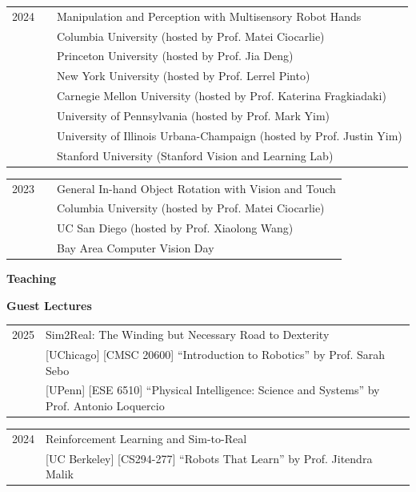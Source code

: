 \documentclass{resume}
\newlength{\myvertspace}
\newcommand{\vs}{ \vspace{\myvertspace} }
\begin{document}
{\renewcommand{\arraystretch}{1.1}
\begin{tabular}{@{}L{0.95cm}L{0.65cm}l@{}}
{2024} & & {Manipulation and Perception with Multisensory Robot Hands} \\  [-0.02cm]
& & {\small Columbia University (hosted by Prof. Matei Ciocarlie)} \\ [-0.02cm]
& & {\small Princeton University (hosted by Prof. Jia Deng)} \\ [-0.02cm]
& & {\small New York University (hosted by Prof. Lerrel Pinto)} \\ [-0.02cm]
& & {\small Carnegie Mellon University (hosted by Prof. Katerina Fragkiadaki)} \\ [-0.02cm]
& & {\small University of Pennsylvania (hosted by Prof. Mark Yim)} \\ [-0.02cm]
& & {\small University of Illinois Urbana-Champaign (hosted by Prof. Justin Yim)} \\ [-0.02cm]
& & {\small Stanford University (Stanford Vision and Learning Lab)} \\
\end{tabular}}

{\renewcommand{\arraystretch}{1.1}
\begin{tabular}{@{}L{0.95cm}L{0.65cm}l@{}}
{2023} & & {General In-hand Object Rotation with Vision and Touch} \\  [-0.02cm]
& & {\small Columbia University (hosted by Prof. Matei Ciocarlie)} \\ [-0.02cm]
& & {\small UC San Diego (hosted by Prof. Xiaolong Wang)} \\ [-0.02cm]
& & {\small Bay Area Computer Vision Day}
\end{tabular}}

\vs
{\bf \large Teaching}
\vs

{\bf Guest Lectures}

{\renewcommand{\arraystretch}{1.1}
\begin{tabular}{@{}L{2.1cm}l@{}}
{2025} & {Sim2Real: The Winding but Necessary Road to Dexterity} \\
& {\small [UChicago] [CMSC 20600] ``Introduction to Robotics'' by Prof. Sarah Sebo} \\
& {\small [UPenn] [ESE 6510] ``Physical Intelligence: Science and Systems'' by Prof. Antonio Loquercio}
\end{tabular}}


{\renewcommand{\arraystretch}{1.1}
\begin{tabular}{@{}L{2.1cm}l@{}}
{2024} & {Reinforcement Learning and Sim-to-Real} \\
& {\small [UC Berkeley] [CS294-277] ``Robots That Learn'' by Prof. Jitendra Malik} 
\end{tabular}}
\end{document}
